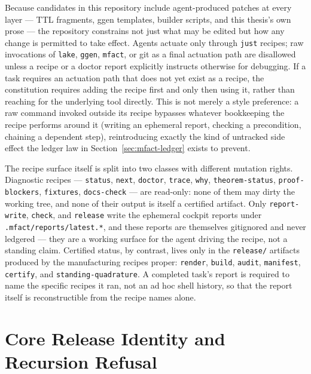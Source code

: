 Because candidates in this repository include agent-produced patches at
every layer --- TTL fragments, ggen templates, builder scripts, and this
thesis's own prose --- the repository constrains not just what may be
edited but how any change is permitted to take effect. Agents actuate
only through \texttt{just} recipes; raw invocations of \texttt{lake},
\texttt{ggen}, \texttt{mfact}, or git as a final actuation path are
disallowed unless a recipe or a doctor report explicitly instructs
otherwise for debugging. If a task requires an actuation path that does
not yet exist as a recipe, the constitution requires adding the recipe
first and only then using it, rather than reaching for the underlying
tool directly. This is not merely a style preference: a raw command
invoked outside its recipe bypasses whatever bookkeeping the recipe
performs around it (writing an ephemeral report, checking a
precondition, chaining a dependent step), reintroducing exactly the kind
of untracked side effect the ledger law in
Section~\ref{sec:mfact-ledger} exists to prevent.

The recipe surface itself is split into two classes with different
mutation rights. Diagnostic recipes --- \texttt{status}, \texttt{next},
\texttt{doctor}, \texttt{trace}, \texttt{why}, \texttt{theorem-status},
\texttt{proof-blockers}, \texttt{fixtures}, \texttt{docs-check} --- are
read-only: none of them may dirty the working tree, and none of their
output is itself a certified artifact. Only \texttt{report-write},
\texttt{check}, and \texttt{release} write the ephemeral cockpit reports
under \texttt{.mfact/reports/latest.*}, and these reports are themselves
gitignored and never ledgered --- they are a working surface for the
agent driving the recipe, not a standing claim. Certified status, by
contrast, lives only in the \texttt{release/} artifacts produced by the
manufacturing recipes proper: \texttt{render}, \texttt{build},
\texttt{audit}, \texttt{manifest}, \texttt{certify}, and
\texttt{standing-quadrature}. A completed task's report is required to
name the specific recipes it ran, not an ad hoc shell history, so that
the report itself is reconstructible from the recipe names alone.

\section{Core Release Identity and Recursion Refusal}
\label{sec:mfact-core-identity}

